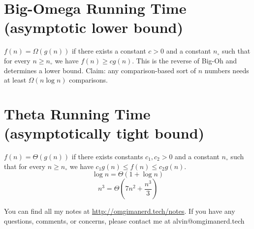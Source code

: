 \documentclass[letterpaper, 12pt]{math}
\begin{document}
\section*{Big-Omega Running Time (asymptotic lower bound)}
\( f(n) = \Omega(g(n)) \) if there exists a constant \( c > 0 \) and a constant
\( n_{\circ} \) such that for every \( n \geq n_{\circ} \) we have
\( f(n) \geq cg(n) \). This is the reverse of Big-Oh and determines a lower
bound. Claim: any comparison-based sort of \( n \) numbers needs at least
\( \Omega(n\log n) \) comparisons.

\section*{Theta Running Time (asymptotically tight bound)}
\( f(n) = \Theta(g(n)) \) if there exists constants \( c_{1},c_{2} > 0 \) and
a constant \( n_{\circ} \) such that for every \( n \geq n_{\circ} \) we have
\( c_{1}g(n) \leq f(n) \leq c_{2}g(n) \).
\[ \log n = \Theta(1+\log n) \]
\[ n^3 = \Theta(7n^2+\frac{n^3}{3}) \]

\begin{center}
  You can find all my notes at \url{http://omgimanerd.tech/notes}. If you have
  any questions, comments, or concerns, please contact me at
  alvin@omgimanerd.tech
\end{center}
\end{document}

